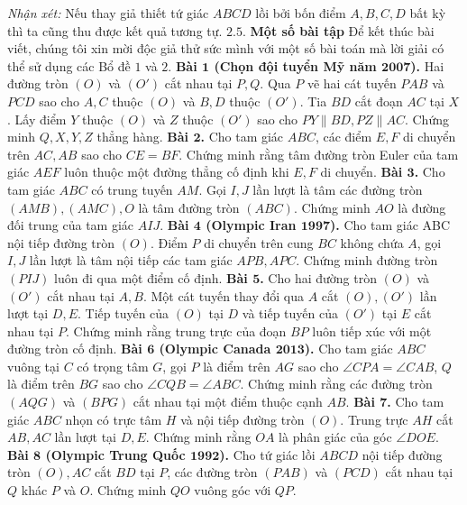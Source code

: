 \begin{multicols}{2}
\begin{figure}[H]
		\vspace*{-10pt}
	\end{figure}
	\textit{Nhận xét:} Nếu thay giả thiết tứ giác $ABCD$ lồi bởi bốn điểm $A,B,C,D$ bất kỳ thì ta cũng thu được kết quả tương tự.
	\vskip 0.1cm
	$\pmb{2.5.}$ \textbf{\color{diendantoanhoc}Một số bài tập}
	\vskip 0.1cm
	Để kết thúc bài viết, chúng tôi xin mời độc giả thử sức mình với một số bài toán mà lời giải có thể sử dụng các Bổ đề $1$ và $2$.
	\vskip 0.1cm
	\textbf{\color{diendantoanhoc}Bài $\pmb{1}$ (Chọn đội tuyển Mỹ năm $\pmb{2007}$).} Hai đường tròn $(O)$ và $(O')$ cắt nhau tại $P,Q$.  Qua $P$ vẽ hai cát tuyến $PAB$ và $PCD$ sao cho $A,C$ thuộc $(O)$ và $B,D$ thuộc $(O')$. Tia $BD$ cắt đoạn $AC$ tại $X$. Lấy điểm $Y$ thuộc $(O)$ và $Z$ thuộc $(O')$ sao cho $PY\parallel BD,PZ\parallel AC$. Chứng minh $Q,X,Y,Z$ thẳng hàng.
	\vskip 0.1cm
	\textbf{\color{diendantoanhoc}Bài $\pmb{2}$.} Cho tam giác $ABC$, các điểm $E,F$ di chuyển trên $AC,AB$ sao cho $CE=BF$. Chứng minh rằng tâm đường tròn Euler của tam giác $AEF$ luôn thuộc một đường thẳng cố định khi $E,F$ di chuyển.
	\vskip 0.1cm
	\textbf{\color{diendantoanhoc}Bài $\pmb{3}$.} Cho tam giác $ABC$ có trung tuyến $AM$. Gọi $I,J$ lần lượt là tâm các đường tròn $(AMB),(AMC),O$ là tâm đường tròn $(ABC)$. Chứng minh $AO$ là đường đối trung của tam giác $AIJ$.
	\vskip 0.1cm
	\textbf{\color{diendantoanhoc}Bài $\pmb{4}$ (Olympic Iran $\pmb{1997}$).} Cho tam giác ABC nội tiếp đường tròn $(O)$. Điểm $P$ di chuyển trên cung $BC$ không chứa $A$, gọi $I,J$ lần lượt là tâm nội tiếp các tam giác $APB,APC$. Chứng minh đường tròn $(PIJ)$ luôn đi qua một điểm cố định.
	\vskip 0.1cm
	\textbf{\color{diendantoanhoc}Bài $\pmb{5}$.} Cho hai đường tròn $(O)$ và $(O')$ cắt nhau  tại $A,B$. Một cát tuyến thay đổi qua $A$ cắt $(O),(O')$ lần lượt tại $D,E$. Tiếp tuyến của $(O)$ tại $D$ và tiếp tuyến của $(O')$ tại $E$ cắt nhau tại $P$. Chứng minh rằng trung trực của đoạn $BP$ luôn tiếp xúc với một đường tròn cố định.
	\vskip 0.1cm
	\textbf{\color{diendantoanhoc}Bài $\pmb{6}$ (Olympic Canada $\pmb{2013}$).} Cho tam giác $ABC$ vuông tại $C$ có trọng tâm $G$, gọi $P$ là điểm trên $AG$ sao cho  $\angle CPA = \angle CAB$, $Q$ là điểm trên $BG$ sao cho  $\angle CQB = \angle ABC$. Chứng minh rằng các đường tròn $(AQG)$ và $(BPG)$ cắt nhau tại một điểm thuộc cạnh $AB$.
	\vskip 0.1cm
	\textbf{\color{diendantoanhoc}Bài $\pmb{7}$.} Cho tam giác $ABC$ nhọn có trực tâm $H$ và nội tiếp đường tròn $(O)$. Trung trực $AH$ cắt $AB,AC$ lần lượt tại $D,E$. Chứng minh rằng $OA$ là phân giác của góc  $\angle DOE$.
	\vskip 0.1cm
	\textbf{\color{diendantoanhoc}Bài $\pmb{8}$ (Olympic Trung Quốc $\pmb{1992}$).} Cho tứ giác lồi $ABCD$ nội tiếp đường tròn $(O),AC$ cắt $BD$ tại $P$, các đường tròn $(PAB)$ và $(PCD)$ cắt nhau tại $Q$ khác $P$ và $O$. Chứng minh $QO$ vuông góc với $QP$.

\end{multicols}
